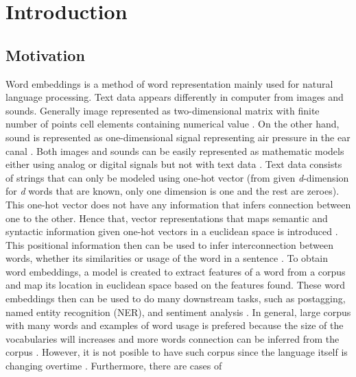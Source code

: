 \chapter{Introduction}
\label{chap:intro}

\section{Motivation} 
    Word embeddings is a method of word representation mainly used for
    natural language processing. Text data appears differently in
    computer from images and sounds. Generally image represented as
    two-dimensional matrix with finite number of points cell elements
    containing numerical value \citep{imageprocessing2018tyagi}. On the
    other hand, sound is represented as one-dimensional signal
    representing air pressure in the ear canal
    \citep{sound1995rocchesso}. Both images and sounds can be easily
    represented as mathematic models either using analog or digital
    signals but not with text data \citep{wordembedding2017yang}. Text
    data consists of strings that can only be modeled using one-hot
    vector (from given \textit{d}-dimension for \textit{d} words that
    are known, only one dimension is one and the rest are zeroes).
    This one-hot vector does not have any information that infers
    connection between one to the other. Hence that, vector
    representations that maps semantic and syntactic information given
    one-hot vectors in a euclidean space is introduced
    \citep{wordembedding2017yang}. This positional information then
    can be used to infer interconnection between words, whether its
    similarities or usage of the word in a sentence
    \citep{distributional1954harris}. To obtain word embeddings, a
    model is created to extract features of a word from a corpus and
    map its location in euclidean space based on the features found.
    These word embeddings then can be used to do many downstream
    tasks, such as postagging, named entity recognition (NER), and
    sentiment analysis \citep{finding2015ling, neural2016lample}. In
    general, large corpus with many words and examples of word usage
    is prefered because the size of the vocabularies will increases
    and more words connection can be inferred from the corpus
    \citep{size2018kutuzov}. However, it is not posible to have such
    corpus since the language itself is changing overtime
    \citep{forrester2008abrief}. Furthermore, there are cases of
